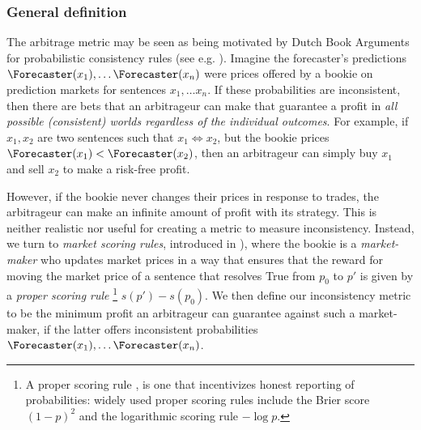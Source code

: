 \subsubsection{General definition}
\label{cfc:sec:arbitrage-general}


\begin{notation*}
\end{notation*}


The arbitrage metric may be seen as being motivated by Dutch Book Arguments for probabilistic consistency rules (see e.g. \citet{vinebergDutchBookArguments2022}). Imagine the forecaster's predictions $\Forecaster(x_1),\dots\Forecaster(x_n)$ were prices offered by a bookie on prediction markets for sentences $x_1,\dots x_n$. If these probabilities are inconsistent, then there are bets that an arbitrageur can make that guarantee a profit in \emph{all possible (consistent) worlds regardless of the individual outcomes}. For example, if $x_1,x_2$ are two sentences such that $x_1\iff x_2$, but the bookie prices $\Forecaster(x_1)<\Forecaster(x_2)$, then an arbitrageur can simply buy $x_1$ and sell $x_2$ to make a risk-free profit.

However, if the bookie never changes their prices in response to trades, the arbitrageur can make an infinite amount of profit with its strategy. This is neither realistic nor useful for creating a metric to measure inconsistency. Instead, we turn to \emph{market scoring rules}, introduced in \citet{hansonLogarithmicMarketScoring2002}), where the bookie is a \emph{market-maker} who updates market prices in a way that ensures that the reward for moving the market price of a sentence that resolves True from $p_0$ to $p'$ is given by a \emph{proper scoring rule} \footnote{A proper scoring rule \citep{savageElicitationPersonalProbabilities1971}, is one that incentivizes honest reporting of probabilities: widely used proper scoring rules include the Brier score $(1-p)^2$ and the logarithmic scoring rule $-\log p$.} $s(p')-s(p_0)$. We then define our inconsistency metric to be the minimum profit an arbitrageur can guarantee against such a market-maker, if the latter offers inconsistent probabilities $\Forecaster(x_1),\dots\Forecaster(x_n)$.

